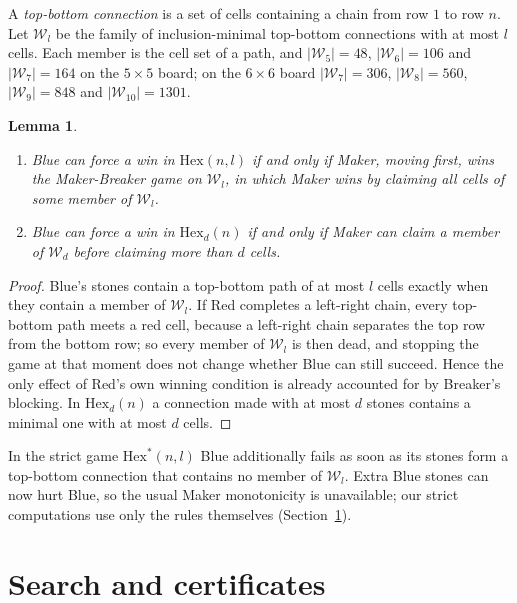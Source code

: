 \documentclass[11pt]{amsart}
\newtheorem{lemma}[theorem]{Lemma}
\theoremstyle{definition}
\theoremstyle{remark}
\newcommand{\Hex}{\mathrm{Hex}}
\newcommand{\W}{\mathcal W}
\begin{document}
A \emph{top-bottom connection} is a set of cells containing a chain from row $1$ to row $n$. Let $\W_l$ be the family of inclusion-minimal top-bottom connections with at most $l$ cells. Each member is the cell set of a path, and $|\W_5|=48$, $|\W_6|=106$ and $|\W_7|=164$ on the $5\times5$ board; on the $6\times6$ board $|\W_7|=306$, $|\W_8|=560$, $|\W_9|=848$ and $|\W_{10}|=1301$.

\begin{lemma}\label{lem:mb}
\begin{enumerate}
\item Blue can force a win in $\Hex(n,l)$ if and only if Maker, moving first, wins the Maker-Breaker game on $\W_l$, in which Maker wins by claiming all cells of some member of $\W_l$.
\item Blue can force a win in $\Hex_d(n)$ if and only if Maker can claim a member of $\W_d$ before claiming more than $d$ cells.
\end{enumerate}
\end{lemma}

\begin{proof}
Blue's stones contain a top-bottom path of at most $l$ cells exactly when they contain a member of $\W_l$. If Red completes a left-right chain, every top-bottom path meets a red cell, because a left-right chain separates the top row from the bottom row; so every member of $\W_l$ is then dead, and stopping the game at that moment does not change whether Blue can still succeed. Hence the only effect of Red's own winning condition is already accounted for by Breaker's blocking. In $\Hex_d(n)$ a connection made with at most $d$ stones contains a minimal one with at most $d$ cells.
\end{proof}

In the strict game $\Hex^{*}(n,l)$ Blue additionally fails as soon as its stones form a top-bottom connection that contains no member of $\W_l$. Extra Blue stones can now hurt Blue, so the usual Maker monotonicity is unavailable; our strict computations use only the rules themselves (Section~\ref{sec:cert}).

\section{Search and certificates}\label{sec:cert}
\end{document}
